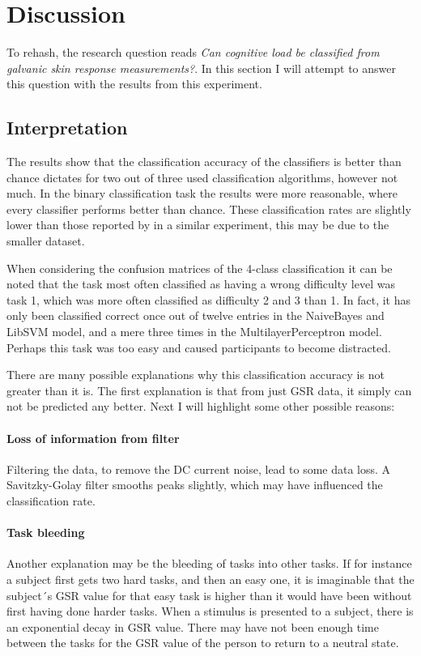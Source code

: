 \documentclass[11pt,leqno,a4paper]{report} %
\begin{document}
\chapter{Discussion}

To rehash, the research question reads \emph{Can cognitive load be classified from galvanic skin response measurements?}. In this section I will attempt to answer this question with the results from this experiment.

\section{Interpretation}

The results show that the classification accuracy of the classifiers is better than chance dictates for two out of three used classification algorithms, however not much. In the binary classification task the results were more reasonable, where every classifier performs better than chance.
These classification rates are slightly lower than those reported by \citet{Nourbakhsh2013} in a similar experiment, this may be due to the smaller dataset.

When considering the confusion matrices of the 4-class classification it can be noted that the task most often classified as having a wrong difficulty level was task 1, which was more often classified as difficulty 2 and 3 than 1. In fact, it has only been classified correct once out of twelve entries in the NaiveBayes and LibSVM model, and a mere three times in the MultilayerPerceptron model. Perhaps this task was too easy and caused participants to become distracted.

There are many possible explanations why this classification accuracy is not greater than it is. The first explanation is that from just GSR data, it simply can not be predicted any better. Next I will highlight some other possible reasons:

\subsubsection{Loss of information from filter}
Filtering the data, to remove the DC current noise, lead to some data loss. A Savitzky-Golay filter smooths peaks slightly, which may have influenced the classification rate.


\subsubsection{Task bleeding}
Another explanation may be the bleeding of tasks into other tasks. If for instance a subject first gets two hard tasks, and then an easy one, it is imaginable that the subject´s GSR value for that easy task is higher than it would have been without first having done harder tasks. When a stimulus is presented to a subject, there is an exponential decay in GSR value. There may have not been enough time between the tasks for the GSR value of the person to return to a neutral state.
\end{document}
